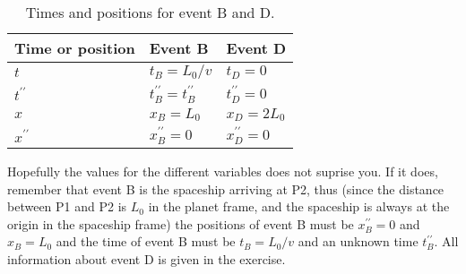 \documentclass[a4paper,10pt,english]{article}
\begin{document}
\begin{table}[H]
  \begin{center}
    \begin{tabular}{| l | l | l |}
   	\hline
	 Time or position & Event B & Event D\\ \hline
	 $t$ & $t_{B}=L_{0}/v$ & $t_{D}=0$ \\ \hline
	 $t^{\prime\prime}$ & $t^{\prime\prime}_{B}=t^{\prime\prime}_{B}$ & $t_{D}^{\prime\prime}=0$\\ \hline
	 $x$ & $x_{B}=L_{0}$ & $x_{D}=2L_{0}$\\ \hline
	 $x^{\prime\prime}$ & $x^{\prime\prime}_{B}=0$ & $x_{D}^{\prime\prime}=0$\\ \hline
	\end{tabular}
    \caption{Times and positions for event B and D.}
    \label{table:ex_2A_8}
  \end{center}
\end{table}
\FloatBarrier

Hopefully the values for the different variables does not suprise you. If it does, remember that event B is the spaceship arriving at P2, thus (since the distance between P1 and P2 is $L_{0}$ in the planet frame, and the spaceship is always at the origin in the spaceship frame) the positions of event B must be $x^{\prime\prime}_{B}=0$ and $x_{B}=L_{0}$ and the time of event B must be $t_{B}=L_{0}/v$ and an unknown time $t^{\prime\prime}_{B}$. All information about event D is given in the exercise.
\end{document}
